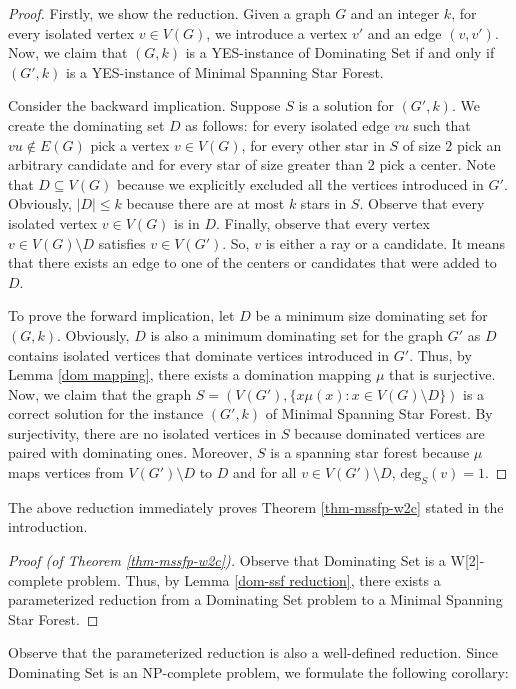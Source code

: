 \documentclass[en]{pracamgr}
\newcommand{\mssfp}{{\sc Minimal Spanning Star Forest}}
\newcommand{\domset}{dominating set}
\newcommand{\domsetp}{{\sc Dominating Set}}
\newcommand{\degree}[2]{\textrm{deg}_{#1}(#2)}
\begin{document}
\begin{proof}
	Firstly, we show the reduction. Given a graph $G$ and an integer $k$, for every isolated vertex $v \in V(G)$, we introduce a vertex $v'$ and an edge $(v,v')$. Now, we claim that $(G,k)$ is a YES-instance of \domsetp{} if and only if $(G',k)$ is a YES-instance of \mssfp{}. 
	
	Consider the backward implication. Suppose $S$ is a solution for $(G',k)$. We create the \domset{} $D$ as follows: for every isolated edge $vu$ such that $vu \notin E(G)$ pick a vertex $v \in V(G)$, for every other star in $S$ of size $2$ pick an arbitrary candidate and for every star of size greater than $2$ pick a center. Note that $D \subseteq V(G)$ because we explicitly excluded all the vertices introduced in $G'$. Obviously, $|D| \leq k$ because there are at most $k$ stars in $S$. Observe that every isolated vertex $v \in V(G)$ is in $D$. Finally, observe that every vertex $v \in V(G) \setminus D$ satisfies $v \in V(G')$. So, $v$ is either a ray or a candidate. It means that there exists an edge to one of the centers or candidates that were added to $D$.
	
	To prove the forward implication, let $D$ be a minimum size dominating set for $(G,k)$. Obviously, $D$ is also a minimum dominating set for the graph $G'$ as $D$ contains isolated vertices that dominate vertices introduced in $G'$. Thus, by Lemma \ref{dom mapping}, there exists a domination mapping $\mu$ that is surjective. Now, we claim that the graph $S=(V(G'),\{x\mu(x): x \in V(G) \setminus D\})$ is a correct solution for the instance $(G',k)$ of \mssfp{}. By surjectivity, there are no isolated vertices in $S$ because dominated vertices are paired with dominating ones. Moreover, $S$ is a spanning star forest because $\mu$ maps vertices from $V(G') \setminus D$ to $D$ and for all $v \in V(G') \setminus D$, $\degree{S}{v}=1$.
	
\end{proof}

The above reduction immediately proves Theorem \ref{thm-mssfp-w2c} stated in the introduction.

\begin{proof}[Proof (of Theorem \ref{thm-mssfp-w2c})]
	Observe that \domsetp{} is a W[2]-complete problem. Thus, by Lemma \ref{dom-ssf reduction}, there exists a parameterized reduction from a \domsetp{} problem to a \mssfp{}.
\end{proof}

Observe that the parameterized reduction is also a well-defined reduction. Since \domsetp{} is an NP-complete problem, we formulate the following corollary:
\end{document}

